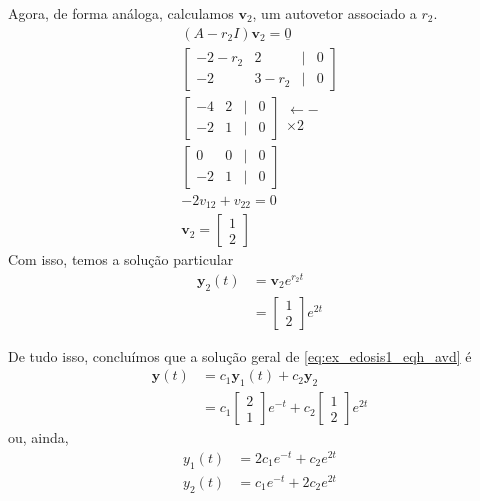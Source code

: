 \begin{ex}
Agora, de forma análoga, calculamos $\pmb{v}_2$, um autovetor associado a $r_2$.
\begin{gather}
  (A-r_2I)\pmb{v}_2 = \underline{0} \\
  \begin{bmatrix}
    -2-r_2 & 2 & | & 0 \\
    -2 & 3-r_2 & | & 0
  \end{bmatrix} \\
  \begin{bmatrix}
    -4 & 2 & | & 0 \\
    -2 & 1 & | & 0
  \end{bmatrix}
  \begin{matrix}
    \leftarrow - \\
    \times 2
  \end{matrix}\\
  \begin{bmatrix}
    0 & 0 & | & 0 \\
    -2 & 1 & | & 0
  \end{bmatrix}\\
    -2v_{12} + v_{22} = 0 \\
  \pmb{v}_2 =
  \begin{bmatrix}
    1 \\
    2
  \end{bmatrix}
\end{gather}
Com isso, temos a solução particular
\begin{align}
  \pmb{y}_2(t) &= \pmb{v}_2e^{r_2t} \\
               &=
                 \begin{bmatrix}
                   1\\
                   2
                 \end{bmatrix}e^{2t}
\end{align}

De tudo isso, concluímos que a solução geral de \eqref{eq:ex_edosis1_eqh_avd} é
\begin{align}
  \pmb{y}(t) &= c_1\pmb{y}_1(t) + c_2\pmb{y}_2 \\
             &= c_1
               \begin{bmatrix}
                 2\\
                 1
               \end{bmatrix}e^{-t} + c_2
  \begin{bmatrix}
    1\\
    2
  \end{bmatrix}e^{2t}
\end{align}
ou, ainda,
\begin{align}
  y_1(t) &= 2c_1e^{-t} + c_2e^{2t} \\
  y_2(t) &= c_1e^{-t} + 2c_2e^{2t}
\end{align}


\end{ex}
